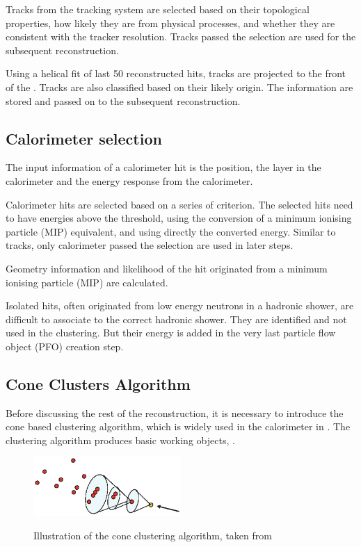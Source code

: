 Tracks from the tracking system are selected based on their topological properties, how likely they are from physical processes, and whether they are consistent with the tracker resolution. Tracks passed the selection are used for the subsequent reconstruction.

Using a helical fit of last 50 reconstructed hits, tracks are projected to the front of the \ECAL. Tracks are also classified based on their likely origin. The information are stored and passed on to the subsequent reconstruction.

\subsection{Calorimeter selection}

The input information of a calorimeter hit is the position, the layer in the calorimeter and the energy response from the calorimeter.

Calorimeter hits are selected based on a series of criterion. The selected hits need to have energies above the threshold, using the conversion of a minimum ionising particle (MIP) equivalent, and using directly the converted energy. Similar to tracks, only calorimeter passed the selection are used in later steps.

Geometry information and likelihood of the hit originated from a minimum ionising particle (MIP) are calculated.

Isolated hits, often originated from low energy neutrons in a hadronic shower, are difficult to associate to the correct hadronic shower. They are identified and not used in the clustering. But their energy is added in the very last particle flow object (PFO) creation step.

\subsection{Cone Clusters Algorithm}
\label{sec:pandoraConeCluster}
Before discussing the rest of the \pandora reconstruction, it is necessary to introduce the cone based clustering algorithm, which is widely used in the calorimeter in \pandora. The clustering algorithm produces basic working objects, \clusters.


\begin{figure}[tbph]
\centering
{\includegraphics[width=0.5\textwidth]{pandora/coneClustering}}%

\caption{Illustration of the cone clustering algorithm, taken from \cite{Marshall:pandoraLC}}
\label{fig:pandoraConeClustering}
\end{figure}

